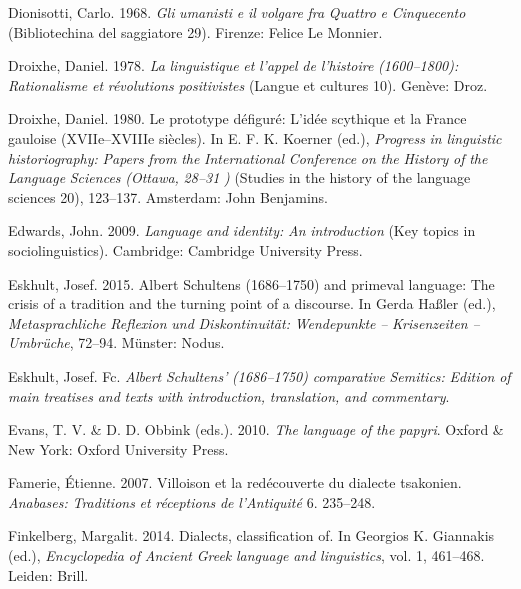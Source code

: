 \documentclass[output=paper]{langsci/langscibook}
\begin{document}
Dionisotti, Carlo. 1968. \textit{Gli} \textit{umanisti} \textit{e} \textit{il} \textit{volgare} \textit{fra} \textit{Quattro} \textit{e} \textit{Cinquecento} (Bibliotechina del saggiatore 29). Firenze: Felice Le Monnier.

Droixhe, Daniel. 1978. \textit{La} \textit{linguistique} \textit{et} \textit{l’appel} \textit{de} \textit{l’histoire} \textit{(1600–1800):} \textit{Rationalisme} \textit{et} \textit{révolutions} \textit{positivistes} (Langue et cultures 10). Genève: Droz.

Droixhe, Daniel. 1980. Le prototype défiguré: L’idée scythique et la France gauloise (XVIIe–XVIIIe siècles). In E. F. K. Koerner (ed.), \textit{Progress} \textit{in} \textit{linguistic} \textit{historiography:} \textit{Papers} \textit{from} \textit{the} \textit{International} \textit{Conference} \textit{on} \textit{the} \textit{History} \textit{of} \textit{the} \textit{Language} \textit{Sciences} \textit{(Ottawa,} \textit{28–31} \textit{\citealt{August1978})} (Studies in the history of the language sciences 20), 123–137. Amsterdam: John Benjamins.

Edwards, John. 2009. \textit{Language} \textit{and} \textit{identity:} \textit{An} \textit{introduction} (Key topics in sociolinguistics). Cambridge: Cambridge University Press.

Eskhult, Josef. 2015. Albert Schultens (1686–1750) and primeval language: The crisis of a tradition and the turning point of a discourse. In Gerda Haßler (ed.), \textit{Metasprachliche} \textit{Reflexion} \textit{und} \textit{Diskontinuität:} \textit{Wendepunkte} \textit{–} \textit{Krisenzeiten} \textit{–} \textit{Umbrüche}, 72–94. Münster: Nodus.

Eskhult, Josef. Fc. \textit{Albert} \textit{Schultens’} \textit{(1686–1750)} \textit{comparative} \textit{Semitics:} \textit{Edition} \textit{of} \textit{main} \textit{treatises} \textit{and} \textit{texts} \textit{with} \textit{introduction,} \textit{translation,} \textit{and} \textit{commentary}.

Evans, T. V. \& D. D. Obbink (eds.). 2010. \textit{The} \textit{language} \textit{of} \textit{the} \textit{papyri}. Oxford \& New York: Oxford University Press.

Famerie, Étienne. 2007. Villoison et la redécouverte du dialecte tsakonien. \textit{Anabases:} \textit{Traditions} \textit{et} \textit{réceptions} \textit{de} \textit{l’Antiquité} 6. 235–248.

Finkelberg, Margalit. 2014. Dialects, classification of. In Georgios K. Giannakis (ed.), \textit{Encyclopedia} \textit{of} \textit{Ancient} \textit{Greek} \textit{language} \textit{and} \textit{linguistics}, vol. 1, 461–468. Leiden: Brill.
\end{document}
